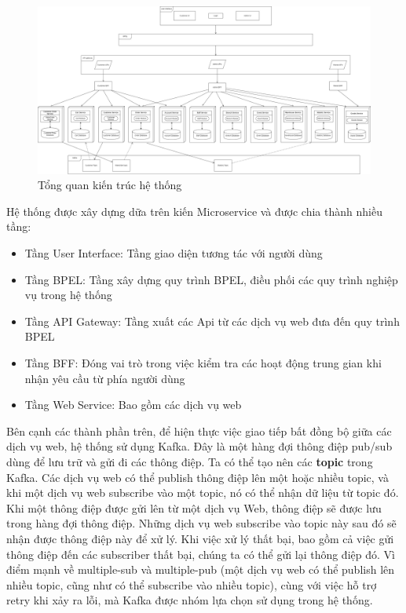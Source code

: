 \begin{figure}[!htp]
	\centering
	\includegraphics[width=6in]{img/Architecture/general-architect.png}
	\newline
	\caption{Tổng quan kiến trúc hệ thống}
\end{figure}

Hệ thống được xây dựng dữa trên kiến Microservice và được chia thành nhiều tầng:
\begin{itemize}
	\item Tầng User Interface: Tầng giao diện tương tác với người dùng
	\item Tầng BPEL: Tầng xây dựng quy trình BPEL, điều phối các quy trình nghiệp vụ trong hệ thống
	\item Tầng API Gateway: Tầng xuất các Api từ các dịch vụ web đưa đến quy trình BPEL
	\item Tầng BFF: Đóng vai trò trong việc kiểm tra các hoạt động trung gian khi nhận yêu cầu từ phía người dùng
	\item Tầng Web Service: Bao gồm các dịch vụ web
\end{itemize}

Bên cạnh các thành phần trên, để hiện thực việc giao tiếp bất đồng bộ giữa các dịch vụ web, hệ thống sử dụng Kafka. Đây là một hàng đợi thông điệp pub/sub dùng để lưu trữ và gửi đi các thông điệp.
Ta có thể tạo nên các \textbf{topic} trong Kafka. Các dịch vụ web có thể publish thông điệp lên một hoặc nhiều topic, 
và khi một dịch vụ web subscribe vào một topic, nó có thể nhận dữ liệu từ topic đó. 
Khi một thông điệp được gửi lên từ một dịch vụ Web, thông điệp sẽ được lưu trong hàng đợi thông điệp. 
Những dịch vụ web subscribe vào topic này sau đó sẽ nhận được thông điệp này để xử lý. 
Khi việc xử lý thất bại, bao gồm cả việc gửi thông điệp đến các subscriber thất bại, chúng ta có thể gửi lại thông điệp đó. 
Vì điểm mạnh về multiple-sub và multiple-pub (một dịch vụ web có thể publish lên nhiều topic, cũng như có thể subscribe vào nhiều topic), cùng với việc hỗ trợ retry khi xảy ra lỗi, mà Kafka được nhóm lựa chọn sử dụng trong hệ thống.

